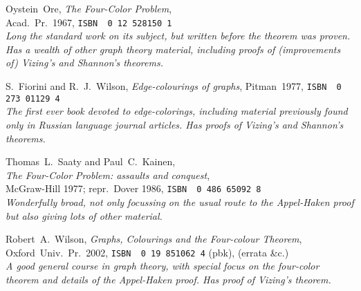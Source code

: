 \documentclass[12pt]{article}
\def\bitem#1{\bibitem[#1]{#1}}
\def\name#1{{\sc #1}}
\def\book#1{{\sl #1\/}}
\def\isbn#1{{\small\tt ISBN\,\,#1}}
\begin{document}
\raggedright
\begin{thebibliography}{MST73}

\bitem{Ore67} \name{Oystein~Ore}, \book{The Four-Color Problem},\\
              Acad.~Pr.~1967, \isbn{0\,12\,528150\,1}\\
              {\it Long the standard work on its subject, but written before
              the theorem was proven. Has a wealth of other graph theory
              material, including proofs of (improvements of) Vizing's and
              Shannon's theorems.}

\bitem{FW77}  \name{S.~Fiorini} and \name{R.~J.~Wilson},
              \book{Edge-colourings of graphs}, Pitman~1977,
              \isbn{0\,273\,01129\,4}\\
              {\em The first ever book devoted to edge-colorings,
              including material previously found only in Russian
              language journal articles. Has proofs of Vizing's and
              Shannon's theorems.}

\bitem{SK77}  \name{Thomas~L.~Saaty} and \name{Paul~C.~Kainen},\\
              \book{The Four-Color Problem: assaults and conquest},\\
              McGraw-Hill 1977; repr.\ Dover 1986,
              \isbn{0\,486\,65092\,8}\\
              {\em Wonderfully broad, not only focussing on the usual
              route to the Appel-Haken proof but also giving lots of
              other material.}

\bitem{Wil02} \name{Robert~A.~Wilson},
              \book{Graphs, Colourings and the Four-colour Theorem},
              Oxford~Univ.~Pr.~2002, \isbn{0\,19\,851062\,4} (pbk),
{\tt{}}
              (errata \&c.)\\
              {\em A good general course in graph theory, with special focus on
              the four-color theorem and details of the Appel-Haken proof.
              Has proof of Vizing's theorem.}

\end{thebibliography}
\end{document}
